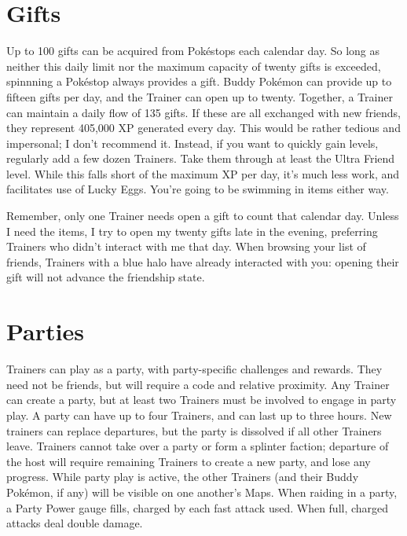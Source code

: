 \section{Gifts\label{sec:gifts}}
Up to 100 gifts can be acquired from Pokéstops each calendar day.
So long as neither this daily limit nor the maximum capacity of twenty gifts
 is exceeded, spinnning a Pokéstop always provides a gift.
Buddy Pokémon can provide up to fifteen gifts per day,
  and the Trainer can open up to twenty.
Together, a Trainer can maintain a daily flow of 135 gifts.
If these are all exchanged with new friends, they represent 405,000 XP generated every day.
This would be rather tedious and impersonal; I don't recommend it.
Instead, if you want to quickly gain levels, regularly add a few dozen Trainers.
Take them through at least the Ultra Friend level.
While this falls short of the maximum XP per day, it's much less work, and facilitates use of Lucky Eggs.
You're going to be swimming in items either way.

Remember, only one Trainer needs open a gift to count that calendar day.
Unless I need the items, I try to open my twenty gifts late in the evening,
  preferring Trainers who didn't interact with me that day.
When browsing your list of friends, Trainers with a blue halo have already interacted with you:
  opening their gift will not advance the friendship state.

\section{Parties\label{sec:parties}}
Trainers can play as a party, with party-specific challenges and rewards.
They need not be friends, but will require a code and relative proximity.
Any Trainer can create a party, but at least two Trainers must be involved to engage in party play.
A party can have up to four Trainers, and can last up to three hours.
New trainers can replace departures, but the party is dissolved if all other Trainers leave.
Trainers cannot take over a party or form a splinter faction; departure of the host will
  require remaining Trainers to create a new party, and lose any progress.
While party play is active, the other Trainers (and their Buddy Pokémon, if any)
  will be visible on one another's Maps.
When raiding in a party, a Party Power gauge fills, charged by each fast attack used.
When full, charged attacks deal double damage.

